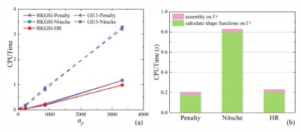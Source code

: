 \begin{figure}[H]
    \centering
    \begin{subcaptiongroup}
    \includegraphics[width=0.49\textwidth]{figure/PHR/R/Ccputime.png}
    \label{Ccputime}
    \includegraphics[width=0.49\textwidth]{figure/PHR/R/Cefficiency.png}
    \label{Cefficiency}
    \end{subcaptiongroup}
\caption{}
\label{RCcputime}
\end{figure}
\newpage

